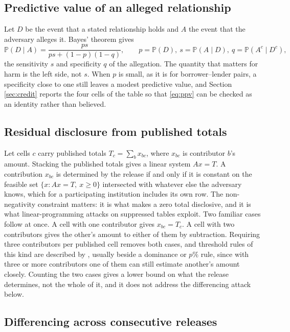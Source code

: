 \documentclass[11pt,a4paper]{article}
\theoremstyle{plain}
\theoremstyle{definition}
\theoremstyle{definition}
\theoremstyle{plain}
\newcommand{\Prob}{\mathbb{P}}
\begin{document}
\subsection{Predictive value of an alleged relationship}

Let $D$ be the event that a stated relationship holds and $A$ the event that the
adversary alleges it. Bayes' theorem gives
\begin{equation}
\Prob(D\mid A)=\frac{p s}{p s+(1-p)(1-q)} ,
\qquad p=\Prob(D),\ s=\Prob(A\mid D),\ q=\Prob(A^c\mid D^c) ,
\label{eq:ppv}
\end{equation}
the sensitivity $s$ and specificity $q$ of the allegation. The quantity that
matters for harm is the left side, not $s$. When $p$ is small, as it is for
borrower--lender pairs, a specificity close to one still leaves a modest
predictive value, and Section \ref{sec:credit} reports the four cells of the
table so that \eqref{eq:ppv} can be checked as an identity rather than believed.

\subsection{Residual disclosure from published totals}

Let cells $c$ carry published totals $T_c=\sum_b x_{bc}$, where $x_{bc}$ is
contributor $b$'s amount. Stacking the published totals gives a linear system
$Ax=T$. A contribution $x_{bc}$ is determined by the release if and only if it is constant
on the feasible set $\{x : Ax=T,\ x\ge 0\}$ intersected with whatever else the
adversary knows, which for a participating institution includes its own row. The
non-negativity constraint matters: it is what makes a zero total
disclosive, and it is what linear-programming attacks on suppressed tables
exploit. Two familiar cases follow at once. A cell with one contributor gives
$x_{bc}=T_c$. A cell with two contributors gives the other's amount to either of
them by subtraction. Requiring three contributors per published cell removes both
cases, and threshold rules of this kind are described by \citet[ch.~4]{hundepool2012},
usually beside a dominance or $p\%$ rule, since with three or more contributors
one of them can still estimate another's amount closely. Counting the two cases
gives a lower bound on what the release determines, not the whole of it, and it
does not address the differencing attack below.

\subsection{Differencing across consecutive releases}
\end{document}
